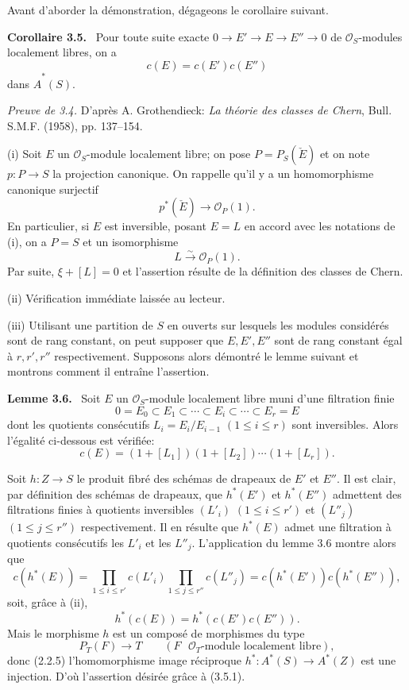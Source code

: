 \documentclass[11pt]{article}
\newenvironment{statement}[1]{\par\medskip\noindent\textbf{#1.}\ }{\par\medskip}
\begin{document}
Avant d'aborder la démonstration, dégageons le corollaire suivant.

\begin{statement}{Corollaire 3.5}
Pour toute suite exacte $0\to E'\to E\to E''\to0$ de $\mathcal O_S$-modules localement libres, on a
\[
c(E)=c(E')c(E'')
\]
dans $\widehat A^*(S)$.
\end{statement}

\emph{Preuve de 3.4.} D'après A. Grothendieck: \emph{La théorie des classes de Chern}, Bull. S.M.F. (1958), pp. 137--154.

(i) Soit $E$ un $\mathcal O_S$-module localement libre; on pose $P=P_S(\check E)$ et on note $p:P\to S$ la projection canonique. On rappelle qu'il y a un homomorphisme canonique surjectif
\[
p^*(\check E)\longrightarrow \mathcal O_P(1).
\]
En particulier, si $E$ est inversible, posant $E=L$ en accord avec les notations de (i), on a $P=S$ et un isomorphisme
\[
L\xrightarrow{\sim}\mathcal O_P(1).
\]
Par suite, $\xi+[L]=0$ et l'assertion résulte de la définition des classes de Chern.

(ii) Vérification immédiate laissée au lecteur.

(iii) Utilisant une partition de $S$ en ouverts sur lesquels les modules considérés sont de rang constant, on peut supposer que $E,E',E''$ sont de rang constant égal à $r,r',r''$ respectivement. Supposons alors démontré le lemme suivant et montrons comment il entraîne l'assertion.

\begin{statement}{Lemme 3.6}
Soit $E$ un $\mathcal O_S$-module localement libre muni d'une filtration finie
\[
0=E_0\subset E_1\subset\cdots\subset E_i\subset\cdots\subset E_r=E
\]
dont les quotients consécutifs $L_i=E_i/E_{i-1}$ $(1\le i\le r)$ sont inversibles. Alors l'égalité ci-dessous est vérifiée:
\[
c(E)=(1+[L_1])(1+[L_2])\cdots(1+[L_r]).
\]
\end{statement}

Soit $h:Z\to S$ le produit fibré des schémas de drapeaux de $E'$ et $E''$. Il est clair, par définition des schémas de drapeaux, que $h^*(E')$ et $h^*(E'')$ admettent des filtrations finies à quotients inversibles $(L'_i)$ $(1\le i\le r')$ et $(L''_j)$ $(1\le j\le r'')$ respectivement. Il en résulte que $h^*(E)$ admet une filtration à quotients consécutifs les $L'_i$ et les $L''_j$. L'application du lemme 3.6 montre alors que
\[
c(h^*(E))=
\prod_{1\le i\le r'}c(L'_i)\prod_{1\le j\le r''}c(L''_j)
=c(h^*(E'))c(h^*(E'')),
\]
soit, grâce à (ii),
\[
h^*(c(E))=h^*(c(E')c(E'')).
\tag{3.5.1}
\]
Mais le morphisme $h$ est un composé de morphismes du type
\[
P_T(F)\longrightarrow T
\qquad (F\text{ }\mathcal O_T\text{-module localement libre}),
\]
donc (2.2.5) l'homomorphisme image réciproque $h^*:A^*(S)\to A^*(Z)$ est une injection. D'où l'assertion désirée grâce à (3.5.1).
\end{document}
